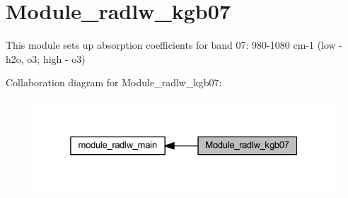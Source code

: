 \hypertarget{group__module__radlw__kgb07}{}\section{Module\+\_\+radlw\+\_\+kgb07}
\label{group__module__radlw__kgb07}


This module sets up absorption coefficients for band 07\+: 980-\/1080 cm-\/1 (low -\/ h2o, o3; high -\/ o3)  


Collaboration diagram for Module\+\_\+radlw\+\_\+kgb07\+:\nopagebreak
\begin{figure}[H]
\begin{center}
\leavevmode
\includegraphics[width=325pt]{group__module__radlw__kgb07}
\end{center}
\end{figure}
